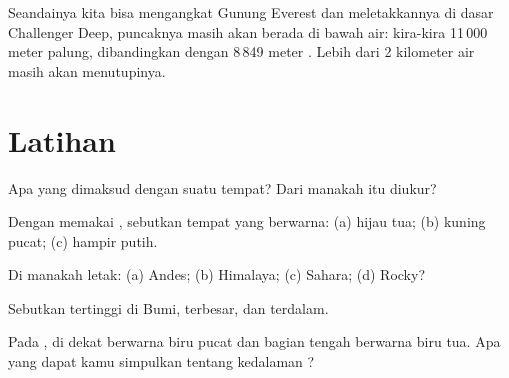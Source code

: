 \begin{example}\label{ex:g4:world-physical-map:everest-in-deep}
Seandainya kita bisa mengangkat Gunung Everest dan meletakkannya di dasar
Challenger Deep, puncaknya masih akan berada di bawah air: kira-kira
11\,000 meter palung, dibandingkan dengan 8\,849 meter . Lebih dari 2
kilometer air  masih akan menutupinya.
\end{example}

\section{Latihan}

\begin{exercise}[$\star$]\label{exo:g4:world-physical-map:1}
Apa yang dimaksud dengan  suatu tempat? Dari  manakah  itu diukur?
\end{exercise}

\begin{exercise}[$\star$]\label{exo:g4:world-physical-map:2}
Dengan memakai  , sebutkan  tempat yang
berwarna: (a) hijau tua; (b) kuning pucat; (c) hampir putih.
\end{exercise}

\begin{exercise}[$\star$]\label{exo:g4:world-physical-map:3}
Di  manakah letak: (a)  Andes; (b) Himalaya; (c) Sahara;
(d)  Rocky?
\end{exercise}

\begin{exercise}[$\star$]\label{exo:g4:world-physical-map:4}
Sebutkan  tertinggi di Bumi,  terbesar, dan  terdalam.
\end{exercise}

\begin{exercise}[$\star$]\label{exo:g4:world-physical-map:5}
Pada ,  di dekat  berwarna biru pucat dan bagian
tengah  berwarna biru tua. Apa yang dapat kamu simpulkan tentang
kedalaman ?
\end{exercise}

